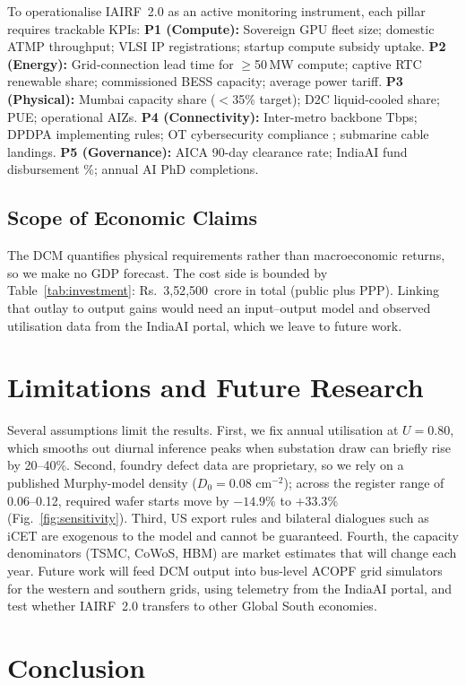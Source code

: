 \documentclass[conference]{IEEEtran}
\begin{document}
To operationalise IAIRF~2.0 as an active monitoring instrument, each pillar requires trackable KPIs:
\textbf{P1 (Compute):} Sovereign GPU fleet size; domestic ATMP throughput; VLSI IP registrations; startup compute subsidy uptake.
\textbf{P2 (Energy):} Grid-connection lead time for $\ge$50\,MW compute; captive RTC renewable share; commissioned BESS capacity; average power tariff.
\textbf{P3 (Physical):} Mumbai capacity share ($<$35\% target); D2C liquid-cooled share; PUE; operational AIZs.
\textbf{P4 (Connectivity):} Inter-metro backbone Tbps; DPDPA implementing rules; OT cybersecurity compliance \cite{denexus2026otcyber}; submarine cable landings.
\textbf{P5 (Governance):} AICA 90-day clearance rate; IndiaAI fund disbursement \%; annual AI PhD completions.

\subsection{Scope of Economic Claims}

The DCM quantifies physical requirements rather than macroeconomic returns, so we make no GDP forecast. The cost side is bounded by Table~\ref{tab:investment}: Rs.~3{,}52{,}500~crore in total (public plus PPP). Linking that outlay to output gains would need an input--output model and observed utilisation data from the IndiaAI portal, which we leave to future work.

\section{Limitations and Future Research}

Several assumptions limit the results. First, we fix annual utilisation at $U = 0.80$, which smooths out diurnal inference peaks when substation draw can briefly rise by 20--40\%. Second, foundry defect data are proprietary, so we rely on a published Murphy-model density ($D_0 = 0.08\text{ cm}^{-2}$); across the register range of 0.06--0.12, required wafer starts move by $-14.9\%$ to $+33.3\%$ (Fig.~\ref{fig:sensitivity}). Third, US export rules and bilateral dialogues such as iCET are exogenous to the model and cannot be guaranteed. Fourth, the capacity denominators (TSMC, CoWoS, HBM) are market estimates that will change each year. Future work will feed DCM output into bus-level ACOPF grid simulators for the western and southern grids, using telemetry from the IndiaAI portal, and test whether IAIRF~2.0 transfers to other Global South economies.

\section{Conclusion}
\end{document}
